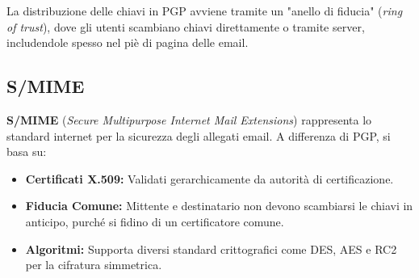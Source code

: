\documentclass{article}
\begin{document}
La distribuzione delle chiavi in PGP avviene tramite un "anello di fiducia" (\textit{ring of trust}), dove gli utenti scambiano chiavi direttamente o tramite server, includendole spesso nel piè di pagina delle email.

\subsection*{S/MIME}

\textbf{S/MIME} (\textit{Secure Multipurpose Internet Mail Extensions}) rappresenta lo standard internet per la sicurezza degli allegati email. A differenza di PGP, si basa su:

\begin{itemize}
    \item \textbf{Certificati X.509:} Validati gerarchicamente da autorità di certificazione.
    \item \textbf{Fiducia Comune:} Mittente e destinatario non devono scambiarsi le chiavi in anticipo, purché si fidino di un certificatore comune.
    \item \textbf{Algoritmi:} Supporta diversi standard crittografici come DES, AES e RC2 per la cifratura simmetrica.
\end{itemize}
\end{document}
